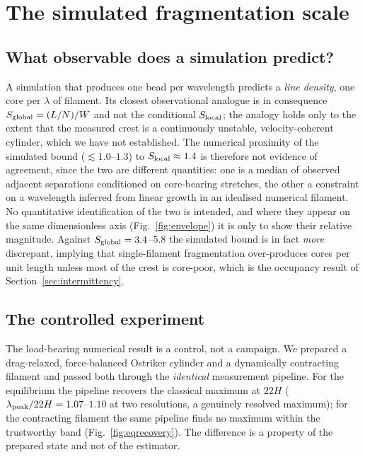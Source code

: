 \documentclass[usenatbib,twoside,twocolumn]{mnras}
\begin{document}
\section{The simulated fragmentation scale}
\label{sec:validation_endtoend}

\subsection{What observable does a simulation predict?}
\label{sec:whatobservable}

A simulation that produces one bead per wavelength predicts a \emph{line density}, one core per $\lambda$ of filament. Its closest observational analogue is in consequence $S_{\rm global}=(L/N)/W$ and not the conditional $S_{\rm local}$; the analogy holds only to the extent that the measured crest is a continuously unstable, velocity-coherent cylinder, which we have not established. The numerical proximity of the simulated bound ($\lesssim1.0$--$1.3$) to $S_{\rm local}\approx1.4$ is therefore not evidence of agreement, since the two are different quantities: one is a median of observed adjacent separations conditioned on core-bearing stretches, the other a constraint on a wavelength inferred from linear growth in an idealised numerical filament. No quantitative identification of the two is intended, and where they appear on the same dimensionless axis (Fig.~\ref{fig:envelope}) it is only to show their relative magnitude. Against $S_{\rm global}=3.4$--$5.8$ the simulated bound is in fact \emph{more} discrepant, implying that single-filament fragmentation over-produces cores per unit length unless most of the crest is core-poor, which is the occupancy result of Section~\ref{sec:intermittency}.

\subsection{The controlled experiment}
\label{sec:control}

The load-bearing numerical result is a control, not a campaign. We prepared a drag-relaxed, force-balanced Ostriker cylinder and a dynamically contracting filament and passed both through the \emph{identical} measurement pipeline. For the equilibrium the pipeline recovers the classical maximum at $22H$ ($\lambda_{\rm peak}/22H=1.07$--$1.10$ at two resolutions, a genuinely resolved maximum); for the contracting filament the same pipeline finds no maximum within the trustworthy band (Fig.~\ref{fig:eqrecovery}). The difference is a property of the prepared state and not of the estimator.
\end{document}
